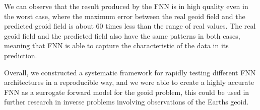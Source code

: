 We can observe that the result produced by the FNN is in high quality even in the worst case, where the maximum error between the real geoid field and the predicted geoid field is about 60 times less than the range of real values. The real geoid field and the predicted field also have the same patterns in both cases, meaning that FNN is able to capture the characteristic of the data in its prediction.

Overall, we constructed a systematic framework for rapidly testing different FNN architectures in a reproducible way, and we were able to create a highly accurate FNN as a surrogate forward model for the geoid problem, this could be used in further research in inverse problems involving observations of the Earths geoid.